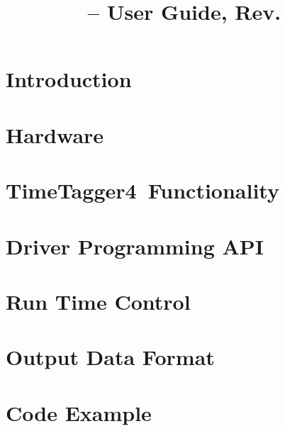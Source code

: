\documentclass[12pt,notitlepage,a4paper]{report}
\title{\deviceName{} -- User Guide, Rev. \ugrev}
\newcommand{\deviceName}{TimeTagger4}%
\newcommand{\itett}[2]{#1}
\newcommand{\itett}[2]{#2}
\newcommand{\ifxHPTDC}[2]{#1}
\newcommand{\ifxHPTDC}[2]{#2}
\newcommand{\ttinput}[1]{}
\newcommand{\titlefile}{"figures/TT4_title.pdf"}
\newcommand{\ttinput}[1]{}
\newcommand{\titlefile}{"figures/xTDC4_title.pdf"}
\newcommand{\ttinput}[1]{}
\newcommand{\titlefile}{figures/xHPTDC8_title.pdf}
\begin{document}
\RaggedRight
\sloppy %
\clearpage
\tableofcontents
\clearpage

% 
    \chapter{Introduction}
        \ttinput{Intro.tex}

    \chapter{Hardware}  
        

    \chapter{\deviceName\ Functionality}
         
        
        
        \itett{
            
        }{}

    \chapter{Driver Programming API\label{cp:api}} 
          
          
    \chapter{Run Time Control\label{cp:readout}}  %
        \ifxHPTDC{
            
        }{
            
        } 

    \chapter{Output Data Format\label{cp:packetformat}} 
        \ifxHPTDC{
             
        }{
            
        }  
 
    \chapter{Code Example}  
        
\end{document}
